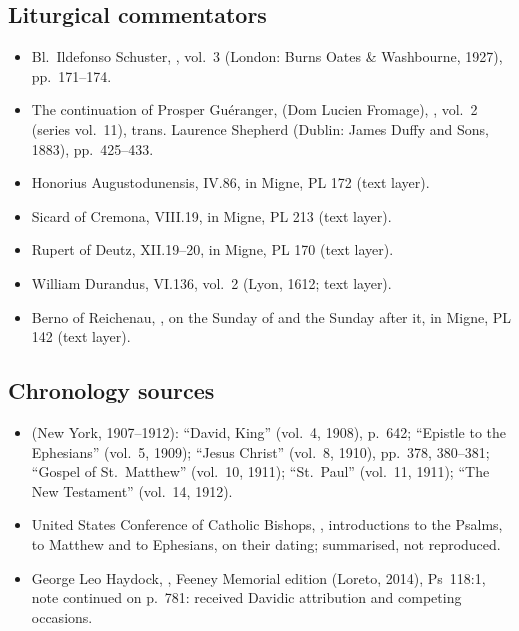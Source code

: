 {\subsection*{Liturgical commentators}
\begin{itemize}
\item Bl.\ Ildefonso Schuster, , vol.~3 (London: Burns Oates \& Washbourne, 1927), pp.~171--174.
\item The continuation of Prosper Guéranger,  (Dom Lucien Fromage), , vol.~2 (series vol.~11), trans. Laurence Shepherd (Dublin: James Duffy and Sons, 1883), pp.~425--433.
\item Honorius Augustodunensis,  IV.86, in Migne, PL 172 (text layer).
\item Sicard of Cremona,  VIII.19, in Migne, PL 213 (text layer).
\item Rupert of Deutz,  XII.19--20, in Migne, PL 170 (text layer).
\item William Durandus,  VI.136, vol.~2 (Lyon, 1612; text layer).
\item Berno of Reichenau, , on the Sunday of  and the Sunday after it, in Migne, PL 142 (text layer).
\end{itemize}

\subsection*{Chronology sources}
\begin{itemize}
\item {} (New York, 1907--1912): ``David, King'' (vol.~4, 1908), p.~642; ``Epistle to the Ephesians'' (vol.~5, 1909); ``Jesus Christ'' (vol.~8, 1910), pp.~378, 380--381; ``Gospel of St.\ Matthew'' (vol.~10, 1911); ``St.\ Paul'' (vol.~11, 1911); ``The New Testament'' (vol.~14, 1912).
\item United States Conference of Catholic Bishops, , introductions to the Psalms, to Matthew and to Ephesians, on their dating; summarised, not reproduced.
\item George Leo Haydock, , Feeney Memorial edition (Loreto, 2014), Ps~118:1, note continued on p.~781: received Davidic attribution and competing occasions.
\end{itemize}
\par}
